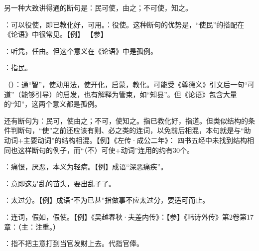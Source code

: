 {另一种大致讲得通的断句是：民可使，由之；不可使，知之。
\begin{lyitemize}
\item {}：可以役使，即已教化好，可用。：役使。这种断句的优势是，“使民”的搭配在《论语》中很常见。【例】     【参】
\item {}：听凭，任由。但这个意义在《论语》中是孤例。%
\item {}：指民。
\item {}（）：通“智”，使动用法，使开化，启蒙，教化。可能受《尊德义》引文后一句“可道”（能够引导）的启发，也有解释为管束，如“知县”。但《论语》包含大量的“知”，这两个意义都是孤例。
\end{lyitemize}

还有断句为：民可，使由之；不可，使知之。指已教化好，指道。但类似结构的条件判断句，“使”之前还应该有则、必之类的连词，以免前后相混，本句就是与“助动词+主要动词”的结构相混。【例】《左传·成公二年》： 四书五经中未找到结构相同也这样断句的例子，而“（不）可使+动词”连用的约有30个。
}
{}


{
\item {}：痛恨，厌恶，本义为轻病。【例】成语“深恶痛疾”。
\item {}：意即这是乱的苗头，要出乱子了。
\item {}：太过分。【例】成语“不为已甚”指做事不应太过分，要适可而止。%
}
{}


{
\item {}：连词，假如，假使。【例】《吴越春秋·夫差内传》：【参】《韩诗外传》第2卷第17章：（主：注重。）
}
{}


{
\item {}：指不把主意打到当官发财上去。代指官俸。
}
{}  %


